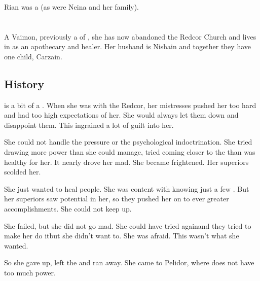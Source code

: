 \subsubsection{\Tulan}
Rian was a  (as were Neina and her family).














\section{\Roanne{} \Deracille}
A Vaimon, previously a \Soror{} of \ClanRedcor, she has now abandoned the Redcor Church and lives in \Redglen{} as an apothecary and healer. Her husband is Nishain \Shireyo{} and together they have one child, Carzain. 









\subsection{History}
\Roanne{} is a bit of a . 
When she was with the Redcor, her mistresses pushed her too hard and had too high expectations of her. 
She would always let them down and disappoint them. 
This ingrained a lot of guilt into her. 

She could not handle the pressure or the psychological indoctrination. 
She tried drawing more \iquin{} power than she could manage, tried coming closer to the \sephiroth{} than was healthy for her. 
It nearly drove her mad. 
She became frightened. 
Her superiors scolded her. 

She just wanted to heal people. 
She was content with knowing just a few \sephiroth. 
But her superiors saw potential in her, so they pushed her on to ever greater accomplishments. 
She could not keep up. 

She failed, but she did not go mad. 
She could have tried again\dash and they tried to make her do it\dash but she didn't want to.
She was afraid. 
This wasn't what she wanted. 

So she gave up, left the \vclan and ran away. 
She came to Pelidor, where \ClanRedcor does not have too much power. 

